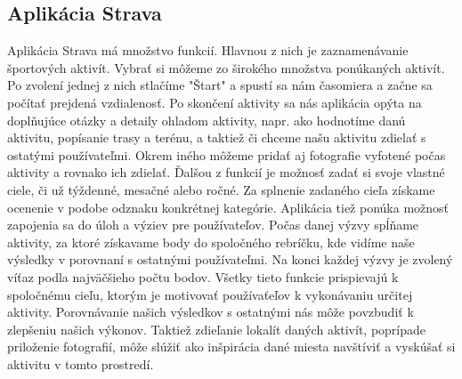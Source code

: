 \documentclass[10pt,twoside,slovak,a4paper]{article}
\begin{document}
\subsection{Aplikácia Strava}
Aplikácia Strava má množstvo funkcií. Hlavnou z nich je zaznamenávanie športových aktivít. Vybrať si môžeme zo širokého množstva ponúkaných aktivít. Po zvolení jednej z nich stlačíme "Štart" a spustí sa nám časomiera a začne sa počítať prejdená vzdialenosť. Po skončení aktivity sa nás aplikácia opýta na doplňujúce otázky a detaily ohladom aktivity, napr. ako hodnotíme danú aktivitu, popísanie trasy a terénu, a taktiež či chceme našu aktivitu zdielať s ostatými používateľmi. Okrem iného môžeme pridať aj fotografie vyfotené počas aktivity a rovnako ich zdielať. Ďalšou z funkcií je možnosť zadať si svoje vlastné ciele, či už týždenné, mesačné alebo ročné. Za splnenie zadaného cieľa získame ocenenie v podobe odznaku konkrétnej kategórie. Aplikácia tiež ponúka možnosť zapojenia sa do úloh a výziev pre používateľov. Počas danej výzvy spĺňame aktivity, za ktoré získavame body do spoločného rebríčku, kde vidíme naše výsledky v porovnaní s ostatnými používateľmi. Na konci každej výzvy je zvolený víťaz podla najväčšieho počtu bodov.  
Všetky tieto funkcie prispievajú k spoločnému cieľu, ktorým je motivovať používaťeľov k vykonávaniu určitej aktivity. Porovnávanie našich výsledkov s ostatnými nás môže povzbudiť k zlepšeniu našich výkonov. Taktiež zdieľanie lokalít daných aktivít, poprípade priloženie fotografií, môže slúžiť ako inšpirácia dané miesta navštíviť a vyskúšať si aktivitu v tomto prostredí.
\end{document}
